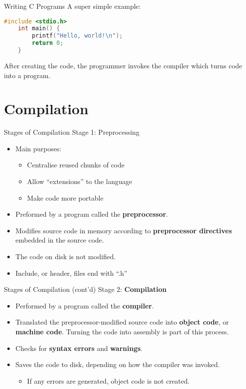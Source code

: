 \documentclass[graphics]{beamer}
\begin{document}
\begin{frame}[fragile]{Writing C Programs}
    A super simple example:
    \begin{lstlisting}[language=c,showspaces=false,keywordstyle=\color{magenta},stringstyle=\color{purple},basicstyle=\ttfamily\footnotesize,numberstyle=\tiny\color{codegray},commentstyle=\color{green},]
    #include <stdio.h>
    int main() {
        printf("Hello, world!\n");
        return 0;
    }
    \end{lstlisting}
    After creating the code, the programmer invokes the compiler which turns code into a program.
\end{frame}

\section{Compilation}
\begin{frame}{Stages of Compilation}
    Stage 1: Preprocessing
    \begin{itemize}
        \item Main purposes:
        \begin{itemize}
            \item Centralise reused chunks of code
            \item Allow ``extensions'' to the language
            \item Make code more portable
        \end{itemize}
        \item Preformed by a program called the \textbf{preprocessor}.
        \item Modifies source code in memory according to \textbf{preprocessor directives} embedded in the source code.
        \item The code on disk is not modified.
        \item Include, or header, files end with ``.h'' 
    \end{itemize}
\end{frame}

\begin{frame}{Stages of Compilation (cont'd)}
    Stage 2: \textbf{Compilation}
    \begin{itemize}
        \item Performed by a program called the \textbf{compiler}.
        \item Translated the preprocessor-modified source code into \textbf{object code}, or \textbf{machine code}. Turning the code into assembly is part of this process.
        \item Checks for \textbf{syntax errors} and \textbf{warnings}.
        \item Saves the code to disk, depending on how the compiler was invoked.
        \begin{itemize}
            \item If any errors are generated, object code is not created.
        \end{itemize}
    \end{itemize}
\end{frame}
\end{document}

